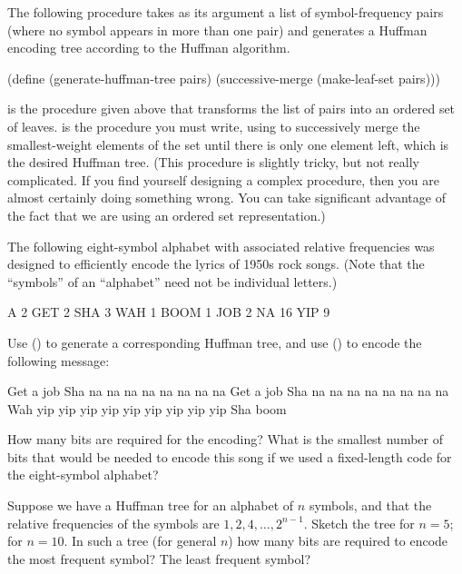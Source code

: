 \begin{exercise}
	\label{Exercise 2.69}
	The following procedure takes as its argument a list of symbol-frequency pairs (where no symbol appears in more than one pair) and generates a Huffman encoding tree according to the Huffman algorithm.
	\begin{scheme}
	  (define (generate-huffman-tree pairs)
	    (successive-merge (make-leaf-set pairs)))
	\end{scheme}
	 is the procedure given above that transforms the list of pairs into an ordered set of leaves.
	 is the procedure you must write, using  to successively merge the smallest-weight elements of the set until there is only one element left, which is the desired Huffman tree.
	(This procedure is slightly tricky, but not really complicated.
	If you find yourself designing a complex procedure, then you are almost certainly doing something wrong.
	You can take significant advantage of the fact that we are using an ordered set representation.)
\end{exercise}



\begin{exercise}
	\label{Exercise 2.70}
	The following eight-symbol alphabet with associated relative frequencies was designed to efficiently encode the lyrics of 1950s rock songs.
	(Note that the “symbols” of an “alphabet” need not be individual letters.)
	\begin{example}
		A    2   GET 2   SHA 3   WAH 1
		BOOM 1   JOB 2   NA 16   YIP 9
	\end{example}
	Use  () to generate a corresponding Huffman tree, and use  () to encode the following message:
	\begin{example}
		Get a job
		Sha na na na na na na na na
		Get a job
		Sha na na na na na na na na
		Wah yip yip yip yip yip yip yip yip yip
		Sha boom
	\end{example}
	How many bits are required for the encoding?
	What is the smallest number of bits that would be needed to encode this song if we used a fixed-length code for the eight-symbol alphabet?
\end{exercise}



\begin{exercise}
	\label{Exercise 2.71}
	Suppose we have a Huffman tree for an alphabet of \( n \) symbols, and that the relative frequencies of the symbols are \( 1, 2, 4, \dotsc, 2^{n-1} \).
	Sketch the tree for \( n = 5 \);
	for \( n = 10 \).
	In such a tree (for general \( n \)) how many bits are required to encode the most frequent symbol?
	The least frequent symbol?
\end{exercise}



